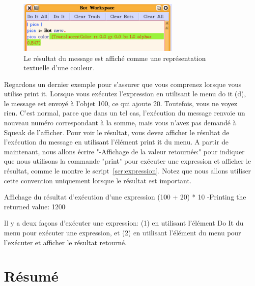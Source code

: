 \documentclass[a4paper,10pt,twoside]{book}
\begin{document}
\begin{figure}
\centerline{\includegraphics[width=8cm]{resultColorPrintIt}} 
\caption{Le r\'esultat du message est affich\'e comme une repr\'esentation textuelle d'une couleur.  \label{fig:resultColorPrintIt}}
\end{figure}

Regardons un dernier exemple pour s'assurer que vous comprenez lorsque vous utilise print it. Lorsque vous ex\'ecutez l'expression  en utilisant le menu do it (d), le message  est envoy\'e \`a l'objet 100, ce qui ajoute 20. Toutefois, vous ne voyez rien. C'est normal, parce que dans un tel cas, l'ex\'ecution du message  renvoie un nouveau num\'ero correspondant \`a la somme, mais vous n'avez pas demand\'e \`a Squeak de l'afficher. Pour voir le r\'esultat, vous devez afficher le r\'esultat de l'ex\'ecution du message en utilisant l'\'el\'ement print it du menu. A partir de maintenant, nous allons \'ecrire "-Affichage de la valeur retourn\'ee:" pour indiquer que nous utilisons la commande "print" pour ex\'ecuter une expression et afficher le r\'esultat, comme le montre le script~\ref{scr:expression}. Notez que nous allons utiliser cette convention uniquement lorsque le r\'esultat est important. 

\begin{script}[expression]{Affichage du r\'esultat d'ex\'ecution d'une expression }
(100 + 20) * 10 
-Printing the returned value: 1200
\end{script}

Il y a deux fa\c cons d'ex\'ecuter une expression: (1) en utilisant l'\'el\'ement Do It du menu pour ex\'ecuter une expression, et (2) en utilisant l'\'el\'ement  du menu pour l'ex\'ecuter et afficher le r\'esultat retourn\'e. 

\section{R\'esum\'e}
\end{document}
